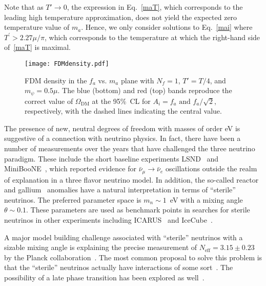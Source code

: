\documentclass[twocolumn,preprintnumbers,
endnote,prl]{revtex4-1}
\begin{document}
Note that as $T'\to 0$, the expression in Eq.~\eqref{maT}, which corresponds to the leading high temperature approximation, does not yield the expected zero temperature value of $m_a$.  Hence, we only consider solutions to Eq.~\eqref{mai} where $T^{\prime} > 2.27 \mu / \pi$, which corresponds to the temperature at which the right-hand side of~\eqref{maT} is maximal.   

%
\begin{figure}
  \centering
\texttt{[image: FDMdensity.pdf]}
   \caption{FDM density in the $f_a$ vs. $m_a$ plane with $N_f=1$, $T'=T/4$, and $m_\psi = 0.5 \mu$. The blue (bottom) and red (top) bands reproduce the correct value of $\Omega_{\text{DM}}$ at the 95\%~CL for $A_i = f_a \text{ and } f_a / \sqrt{2}$, respectively, with the dashed lines indicating the central value.}
 \label{fig:FDM}
 \end{figure} 
 
The presence of new, neutral degrees of freedom with masses of order eV is suggestive of a connection with neutrino physics. In fact, there have been a number of measurements over the years that have challenged the three neutrino paradigm. These include the short baseline experiments LSND~\cite{Athanassopoulos:1995iw, Aguilar:2001ty} and MiniBooNE~\cite{Aguilar-Arevalo:2013pmq}, which reported evidence for $\bar{\nu}_{\mu} \to \bar{\nu}_{e}$ oscillations outside the realm of explanation in a three flavor neutrino model. In addition, the so-called reactor~\cite{Mention:2011rk} and gallium~\cite{Abdurashitov:2005tb, Giunti:2012tn} anomalies have a natural interpretation in terms of ``sterile'' neutrinos. The preferred parameter space is $m_n \sim 1$~eV with a mixing angle $\theta \sim 0.1$. These parameters are used as benchmark points in searches for sterile neutrinos in other experiments including ICARUS~\cite{Antonello:2013gut} and IceCube~\cite{TheIceCube:2016oqi}. 

A major model building challenge associated with ``sterile'' neutrinos with a sizable mixing angle is explaining the precise measurement of $N_{\text{eff}} = 3.15 \pm 0.23$ by the Planck collaboration~\cite{Ade:2015xua}. The most common proposal to solve this problem is that the ``sterile'' neutrinos actually have interactions of some sort~\cite{Hannestad:2013ana, Dasgupta:2013zpn, Bringmann:2013vra, Archidiacono:2014nda, Saviano:2014esa, Mirizzi:2014ama, Chu:2015ipa, Cherry:2016jol}. The possibility of a late phase transition has been explored as well~\cite{Vecchi:2016lty}.
\end{document}
